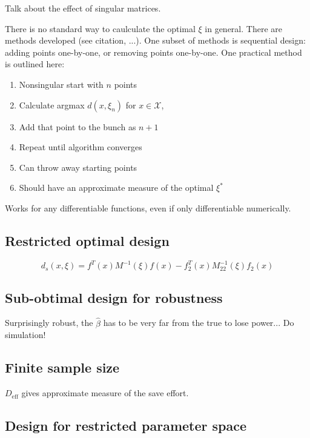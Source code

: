 \documentclass[12pt]{iopart}
\begin{document}
Talk about the effect of singular matrices.

There is no standard way to caulculate the optimal $\xi$ in general. There are methods developed (see citation, ...). One subset of methods is sequential design: adding points one-by-one, or removing points one-by-one. One practical method is outlined here:

\begin{enumerate}
\item Nonsingular start with $n$ points
\item Calculate argmax $d(x, \xi_n)$ for $x \in \mathcal{X}$,
\item Add that point to the bunch as $n+1$
\item Repeat until algorithm converges
\item Can throw away starting points
\item Should have an approximate measure of the optimal $\xi^*$
\end{enumerate}
Works for any differentiable functions, even if only differentiable numerically.

\subsection{Restricted optimal design}

\begin{equation}
d_s(x, \xi) = f^T(x) M^{-1}(\xi)f(x) - f_2^T(x) M_{22}^{-1}(\xi)f_2(x)
\label{eq:dsvar}
\end{equation}

\subsection{Sub-obtimal design for robustness}

Surprisingly robust, the $\hat \beta$ has to be very far from the true to lose power... Do simulation!

\subsection{Finite sample size}

$D_\mathrm{eff}$ gives approximate measure of the save effort.


\subsection{Design for restricted parameter space}
\end{document}
